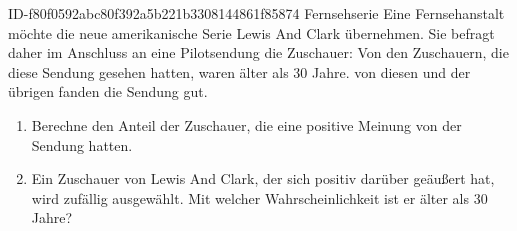 \begin{exercise}
      {ID-f80f0592abc80f392a5b221b3308144861f85874}
      {Fernsehserie}
  \ifproblem\problem
    Eine Fernsehanstalt möchte die neue amerikanische Serie \glqq Lewis And Clark\grqq{}
    übernehmen. Sie befragt daher im Anschluss an eine Pilotsendung die Zuschauer:
    Von den Zuschauern, die diese Sendung gesehen hatten, waren  älter als
    30 Jahre.  von diesen und  der übrigen fanden die Sendung gut.
    \begin{enumerate}
      \item Berechne den Anteil der Zuschauer, die eine positive Meinung
            von der Sendung hatten.
      \item Ein Zuschauer von \glqq Lewis And Clark\grqq, der sich positiv
            darüber geäußert hat, wird zufällig ausgewählt. Mit welcher
            Wahrscheinlichkeit ist er älter als 30 Jahre?
    \end{enumerate}
  \fi
\end{exercise}
